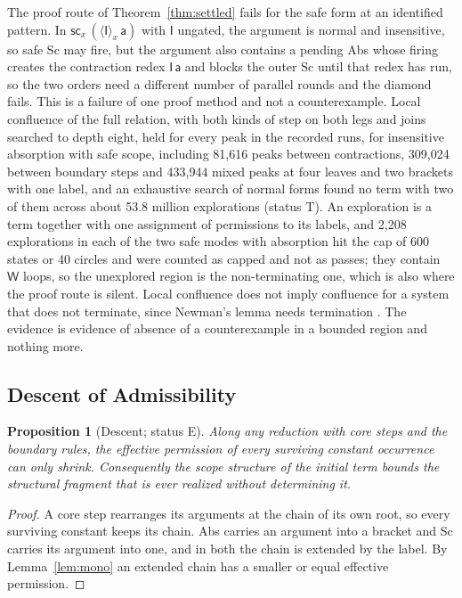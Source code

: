 \documentclass[11pt]{article}
\newtheorem{proposition}[theorem]{Proposition}
\theoremstyle{definition}
\theoremstyle{remark}
\newcommand{\cI}{\mathsf{I}}
\newcommand{\cW}{\mathsf{W}}
\newcommand{\br}[2]{\langle #1\rangle_{#2}}
\newcommand{\sca}[1]{\mathsf{sc}_{#1}}
\newcommand{\Et}{status E}
\newcommand{\Tt}{status T}
\begin{document}
The proof route of Theorem~\ref{thm:settled} fails for the safe form at an identified pattern. In $\sca x\,(\br{\cI}x\,\mathsf a)$ with $\cI$ ungated, the argument is normal and insensitive, so safe $\mathrm{Sc}$ may fire, but the argument also contains a pending Abs whose firing creates the contraction redex $\cI\,\mathsf a$ and blocks the outer $\mathrm{Sc}$ until that redex has run, so the two orders need a different number of parallel rounds and the diamond fails. This is a failure of one proof method and not a counterexample. Local confluence of the full relation, with both kinds of step on both legs and joins searched to depth eight, held for every peak in the recorded runs, for insensitive absorption with safe scope, including 81{,}616 peaks between contractions, 309{,}024 between boundary steps and 433{,}944 mixed peaks at four leaves and two brackets with one label, and an exhaustive search of normal forms found no term with two of them across about 53.8 million explorations (\Tt). An exploration is a term together with one assignment of permissions to its labels, and 2{,}208 explorations in each of the two safe modes with absorption hit the cap of 600 states or 40 circles and were counted as capped and not as passes; they contain $\cW$ loops, so the unexplored region is the non-terminating one, which is also where the proof route is silent. Local confluence does not imply confluence for a system that does not terminate, since Newman's lemma needs termination \citep{newman1942}. The evidence is evidence of absence of a counterexample in a bounded region and nothing more.

\subsection{Descent of Admissibility}

\begin{proposition}[Descent; \Et]\label{prop:descent}
Along any reduction with core steps and the boundary rules, the effective permission of every surviving constant occurrence can only shrink. Consequently the scope structure of the initial term bounds the structural fragment that is ever realized without determining it.
\end{proposition}

\begin{proof}
A core step rearranges its arguments at the chain of its own root, so every surviving constant keeps its chain. Abs carries an argument into a bracket and Sc carries its argument into one, and in both the chain is extended by the label. By Lemma~\ref{lem:mono} an extended chain has a smaller or equal effective permission.
\end{proof}
\end{document}
